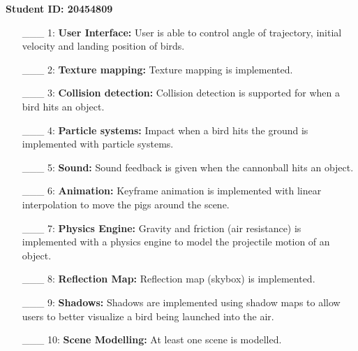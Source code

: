 \documentclass {article}
\begin{document}
{\bf Student ID: 20454809}

\begin{enumerate}
     \item[\_\_\_ 1:]  {\bf User Interface:} User is able to control angle of trajectory, initial velocity and landing position of birds.

     \item[\_\_\_ 2:]  {\bf Texture mapping:} Texture mapping is implemented.

     \item[\_\_\_ 3:]  {\bf Collision detection:} Collision detection is supported for when a bird hits an object.
     
     \item[\_\_\_ 4:]  {\bf Particle systems:} Impact when a bird hits the ground is implemented with particle systems.

     \item[\_\_\_ 5:]  {\bf Sound:} Sound feedback is given when the cannonball hits an object.

     \item[\_\_\_ 6:]  {\bf Animation:} Keyframe animation is implemented with linear interpolation to move the pigs around the scene.

     \item[\_\_\_ 7:]  {\bf Physics Engine:} Gravity and friction (air resistance) is implemented with a physics engine to model the projectile motion of an object.

     \item[\_\_\_ 8:]  {\bf Reflection Map:} Reflection map (skybox) is implemented.

     \item[\_\_\_ 9:]  {\bf Shadows:} Shadows are implemented using shadow maps
 to allow users to better visualize a bird being launched into the air.

     \item[\_\_\_ 10:]  {\bf Scene Modelling:} At least one scene is modelled.
\end{enumerate}
\end{document}
